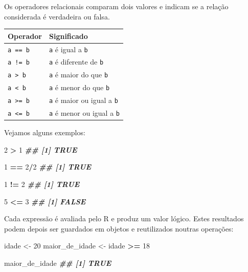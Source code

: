 \documentclass[
  portuguese,
  11pt,
  openany]{book}
\newenvironment{Shaded}{\begin{snugshade}}{\end{snugshade}}
\newcommand{\DecValTok}[1]{\textcolor[rgb]{0.00,0.00,0.81}{#1}}
\newcommand{\DocumentationTok}[1]{\textcolor[rgb]{0.56,0.35,0.01}{\textbf{\textit{#1}}}}
\newcommand{\NormalTok}[1]{#1}
\newcommand{\OtherTok}[1]{\textcolor[rgb]{0.56,0.35,0.01}{#1}}
\newcommand{\SpecialCharTok}[1]{\textcolor[rgb]{0.81,0.36,0.00}{\textbf{#1}}}
\newcounter{none} %
\begin{document}
Os operadores relacionais comparam dois valores e indicam se a relação considerada é verdadeira ou falsa.

{\def\LTcaptype{none} %
\begin{longtable}[]{@{}ll@{}}
\toprule\noalign{}
Operador & Significado \\
\midrule\noalign{}
\endhead
\bottomrule\noalign{}
\endlastfoot
\texttt{a\ ==\ b} & \texttt{a} é igual a \texttt{b} \\
\texttt{a\ !=\ b} & \texttt{a} é diferente de \texttt{b} \\
\texttt{a\ \textgreater{}\ b} & \texttt{a} é maior do que \texttt{b} \\
\texttt{a\ \textless{}\ b} & \texttt{a} é menor do que \texttt{b} \\
\texttt{a\ \textgreater{}=\ b} & \texttt{a} é maior ou igual a \texttt{b} \\
\texttt{a\ \textless{}=\ b} & \texttt{a} é menor ou igual a \texttt{b} \\
\end{longtable}
}

Vejamos alguns exemplos:

\begin{Shaded}
\begin{Highlighting}[]
\DecValTok{2} \SpecialCharTok{\textgreater{}} \DecValTok{1}
\DocumentationTok{\#\# [1] TRUE}

\DecValTok{1} \SpecialCharTok{==} \DecValTok{2}\SpecialCharTok{/}\DecValTok{2}
\DocumentationTok{\#\# [1] TRUE}

\DecValTok{1} \SpecialCharTok{!=} \DecValTok{2}
\DocumentationTok{\#\# [1] TRUE}

\DecValTok{5} \SpecialCharTok{\textless{}=} \DecValTok{3}
\DocumentationTok{\#\# [1] FALSE}
\end{Highlighting}
\end{Shaded}

Cada expressão é avaliada pelo R e produz um valor lógico. Estes resultados podem depois ser guardados em objetos e reutilizados noutras operações:

\begin{Shaded}
\begin{Highlighting}[]
\NormalTok{idade }\OtherTok{\textless{}{-}} \DecValTok{20}
\NormalTok{maior\_de\_idade }\OtherTok{\textless{}{-}}\NormalTok{ idade }\SpecialCharTok{\textgreater{}=} \DecValTok{18}

\NormalTok{maior\_de\_idade}
\DocumentationTok{\#\# [1] TRUE}
\end{Highlighting}
\end{Shaded}
\end{document}
